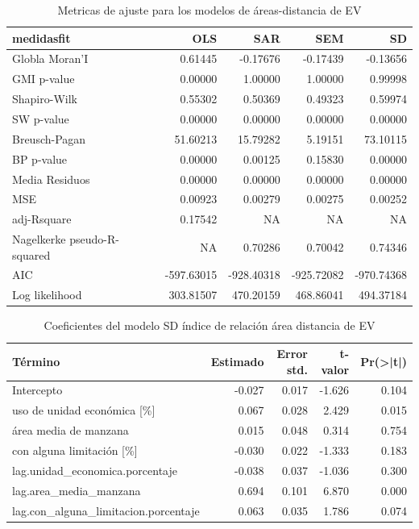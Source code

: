 \documentclass[12pt,a4paper,openany]{book}
\theoremstyle{definition}
\theoremstyle{definition}
\theoremstyle{definition}
\theoremstyle{remark}
\begin{document}
\begin{table}[H]

\caption{\label{tab:tabla-comp-modelos-areasdist}Metricas de ajuste para los modelos de áreas-distancia de EV}
\centering
\begin{tabular}{lrrrr}
\toprule
medidasfit & OLS & SAR & SEM & SD\\
\midrule
Globla Moran'I & 0.61445 & -0.17676 & -0.17439 & -0.13656\\
GMI p-value & 0.00000 & 1.00000 & 1.00000 & 0.99998\\
Shapiro-Wilk & 0.55302 & 0.50369 & 0.49323 & 0.59974\\
SW p-value & 0.00000 & 0.00000 & 0.00000 & 0.00000\\
Breusch-Pagan & 51.60213 & 15.79282 & 5.19151 & 73.10115\\
\addlinespace
BP p-value & 0.00000 & 0.00125 & 0.15830 & 0.00000\\
Media Residuos & 0.00000 & 0.00000 & 0.00000 & 0.00000\\
MSE & 0.00923 & 0.00279 & 0.00275 & 0.00252\\
adj-Rsquare & 0.17542 & NA & NA & NA\\
Nagelkerke pseudo-R-squared & NA & 0.70286 & 0.70042 & 0.74346\\
\addlinespace
AIC & -597.63015 & -928.40318 & -925.72082 & -970.74368\\
Log likelihood & 303.81507 & 470.20159 & 468.86041 & 494.37184\\
\bottomrule
\end{tabular}
\end{table}

\begin{table}[H]

\caption{\label{tab:coef-sd-areasdist}Coeficientes del modelo SD índice de relación área distancia de EV}
\centering
\begin{tabular}{lrrrr}
\toprule
Término & Estimado & Error std. & t-valor & Pr(>|t|)\\
\midrule
Intercepto & -0.027 & 0.017 & -1.626 & 0.104\\
uso de unidad económica [\%] & 0.067 & 0.028 & 2.429 & 0.015\\
área media de manzana & 0.015 & 0.048 & 0.314 & 0.754\\
con alguna limitación [\%] & -0.030 & 0.022 & -1.333 & 0.183\\
lag.unidad\_economica.porcentaje & -0.038 & 0.037 & -1.036 & 0.300\\
\addlinespace
lag.area\_media\_manzana & 0.694 & 0.101 & 6.870 & 0.000\\
lag.con\_alguna\_limitacion.porcentaje & 0.063 & 0.035 & 1.786 & 0.074\\
\bottomrule
\end{tabular}
\end{table}
\end{document}
